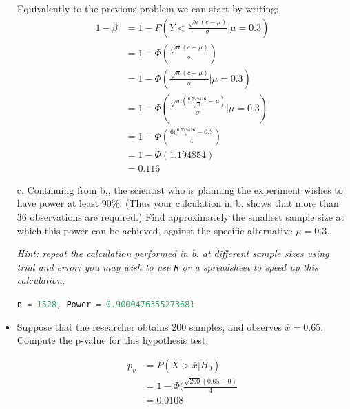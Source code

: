 \documentclass{article}
\newcommand{\1}{\mathbf{1}}
\begin{document}
\begin{itemize}
    Equivalently to the previous problem we can start by writing:
    \begin{align*}
        1 - \beta &=  1- P \left(Y < \frac{\sqrt{n}(c - \mu)}{\sigma}  \bigg | \mu=0.3 \right) \\
        &=  1 - \Phi  \left(\frac{\sqrt{n}(c - \mu)}{\sigma}\right) \\
        &= 1- \Phi\left( \frac{\sqrt{n}(c - \mu)}{\sigma}  \bigg | \mu=0.3 \right) \\
        &= 1- \Phi\left( \frac{\sqrt{n}(\frac{6.579416}{\sqrt{n}} - \mu)}{\sigma}  \bigg | \mu=0.3 \right) \\
        &= 1- \Phi\left( \frac{6(\frac{6.579416}{6} - 0.3}{4} \right) \\
        &= 1- \Phi(1.194854 ) \\
        &= 0.116
    \end{align*}

    \item[c.] Continuing from b., the scientist who is planning the experiment wishes to have power at least $90\%$. (Thus your calculation in b. shows that more than $36$ observations are required.) Find approximately the smallest sample size at which this power can be achieved, against the specific alternative $\mu=0.3$.\par 
    {\it Hint: repeat the calculation performed in {\rm b.} at different sample sizes using trial and error: you may wish to use {\tt R} or a spreadsheet to speed up this calculation.}
    
     \lstinline[language=Python]{n = 1528, Power = 0.9000476355273681}
     
    
   

   \item[d.] Suppose that the researcher obtains $200$ samples, and observes $\bar{x} = 0.65$. Compute the p-value for this hypothesis test.
   
   \begin{align*}
       p_v &= P(\bar X > \bar x | H_0) \\
       &= 1 - \Phi(\frac{\sqrt{200}(0.65 - 0)}{4} \\
       &= 0.0108
   \end{align*}
\end{itemize}


\newpage
\end{document}
